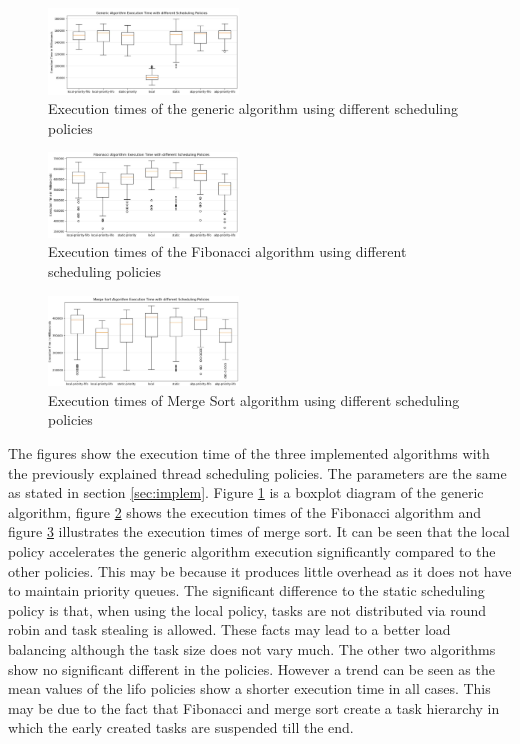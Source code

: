 \begin{figure}[h]
	\centering
	\includegraphics[width=0.45\textwidth]{figures/genSchedule.JPG}
	\caption{Execution times of the generic algorithm using different scheduling policies}
	\label{fig:gen_Schedule}
\end{figure}
\begin{figure}[h]
	\centering
	\includegraphics[width=0.45\textwidth]{figures/fibSchedule.JPG}
	\caption{Execution times of the Fibonacci algorithm using different scheduling policies}
	\label{fig:fib_Schedule}
\end{figure}
\begin{figure}[h]
	\centering
	\includegraphics[width=0.45\textwidth]{figures/sortSchedule.JPG}
	\caption{Execution times of Merge Sort algorithm using different scheduling policies}
	\label{fig:sort_Schedule}
\end{figure}

The figures show the execution time of the three implemented algorithms with the previously explained thread scheduling policies.
The parameters are the same as stated in section \ref{sec:implem}.
Figure \ref{fig:gen_Schedule} is a boxplot diagram of the generic algorithm, figure \ref{fig:fib_Schedule} shows the execution times of the Fibonacci algorithm and figure \ref{fig:sort_Schedule} illustrates the execution times of merge sort.
It can be seen that the local policy accelerates the generic algorithm execution significantly compared to the other policies.
This may be because it produces little overhead as it does not have to maintain priority queues.
The significant difference to the static scheduling policy is that, when using the local policy, tasks are not distributed via round robin and task stealing is allowed.
These facts may lead to a better load balancing although the task size does not vary much.
The other two algorithms show no significant different in the policies.
However a trend can be seen as the mean values of the lifo policies show a shorter execution time in all cases.
This may be due to the fact that Fibonacci and merge sort create a task hierarchy in which the early created tasks are suspended till the end.

